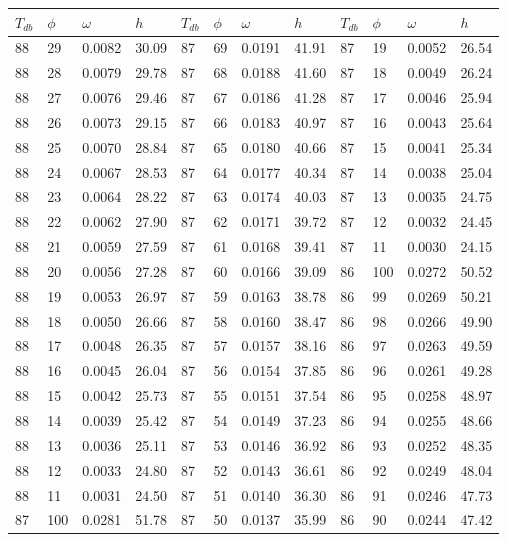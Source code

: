 \begin{tabular}{llll|llll|llll}
 \toprule 
\(T_{db}\) & \(\phi\) & \(\omega\) & \(h\) & \(T_{db}\) & \(\phi\) & \(\omega\) & \(h\) & \(T_{db}\) & \(\phi\) & \(\omega\) & \(h\)  \\ \midrule 
88 & 29 & 0.0082 & 30.09 & 87 & 69 & 0.0191 & 41.91 & 87 & 19 & 0.0052 & 26.54\\
88 & 28 & 0.0079 & 29.78 & 87 & 68 & 0.0188 & 41.60 & 87 & 18 & 0.0049 & 26.24\\
88 & 27 & 0.0076 & 29.46 & 87 & 67 & 0.0186 & 41.28 & 87 & 17 & 0.0046 & 25.94\\
88 & 26 & 0.0073 & 29.15 & 87 & 66 & 0.0183 & 40.97 & 87 & 16 & 0.0043 & 25.64\\
88 & 25 & 0.0070 & 28.84 & 87 & 65 & 0.0180 & 40.66 & 87 & 15 & 0.0041 & 25.34\\
88 & 24 & 0.0067 & 28.53 & 87 & 64 & 0.0177 & 40.34 & 87 & 14 & 0.0038 & 25.04\\
88 & 23 & 0.0064 & 28.22 & 87 & 63 & 0.0174 & 40.03 & 87 & 13 & 0.0035 & 24.75\\
88 & 22 & 0.0062 & 27.90 & 87 & 62 & 0.0171 & 39.72 & 87 & 12 & 0.0032 & 24.45\\
88 & 21 & 0.0059 & 27.59 & 87 & 61 & 0.0168 & 39.41 & 87 & 11 & 0.0030 & 24.15\\
88 & 20 & 0.0056 & 27.28 & 87 & 60 & 0.0166 & 39.09 & 86 & 100 & 0.0272 & 50.52\\
88 & 19 & 0.0053 & 26.97 & 87 & 59 & 0.0163 & 38.78 & 86 & 99 & 0.0269 & 50.21\\
88 & 18 & 0.0050 & 26.66 & 87 & 58 & 0.0160 & 38.47 & 86 & 98 & 0.0266 & 49.90\\
88 & 17 & 0.0048 & 26.35 & 87 & 57 & 0.0157 & 38.16 & 86 & 97 & 0.0263 & 49.59\\
88 & 16 & 0.0045 & 26.04 & 87 & 56 & 0.0154 & 37.85 & 86 & 96 & 0.0261 & 49.28\\
88 & 15 & 0.0042 & 25.73 & 87 & 55 & 0.0151 & 37.54 & 86 & 95 & 0.0258 & 48.97\\
88 & 14 & 0.0039 & 25.42 & 87 & 54 & 0.0149 & 37.23 & 86 & 94 & 0.0255 & 48.66\\
88 & 13 & 0.0036 & 25.11 & 87 & 53 & 0.0146 & 36.92 & 86 & 93 & 0.0252 & 48.35\\
88 & 12 & 0.0033 & 24.80 & 87 & 52 & 0.0143 & 36.61 & 86 & 92 & 0.0249 & 48.04\\
88 & 11 & 0.0031 & 24.50 & 87 & 51 & 0.0140 & 36.30 & 86 & 91 & 0.0246 & 47.73\\
87 & 100 & 0.0281 & 51.78 & 87 & 50 & 0.0137 & 35.99 & 86 & 90 & 0.0244 & 47.42\\

\end{tabular}
